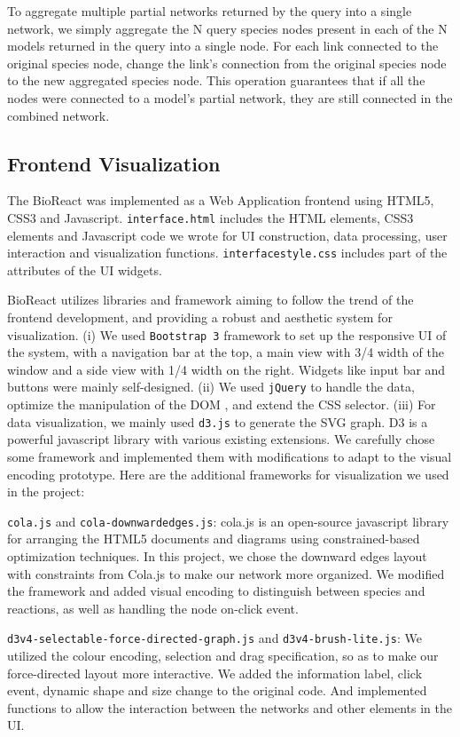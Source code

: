 \documentclass[journal]{vgtc}                %
\begin{document}
To aggregate multiple partial networks returned by the query into a single network, we simply aggregate the N query species nodes present in each of the N models returned in the query into a single node. For each link connected to the original species node, change the link’s connection from the original species node to the new aggregated species node. This operation guarantees that if all the nodes were connected to a model’s partial network, they are still connected in the combined network.

\subsection{Frontend Visualization}
The BioReact was implemented as a Web Application frontend using HTML5, CSS3 and Javascript. \texttt{interface.html} includes the HTML elements, CSS3 elements and Javascript code we wrote for UI construction, data processing, user interaction and visualization functions. \texttt{interface\textunderscore style.css} includes part of the attributes of the UI widgets.

BioReact utilizes libraries and framework aiming to follow the trend of the frontend development, and providing a robust and aesthetic system for visualization. (i) We used \texttt{Bootstrap 3} framework to set up the responsive UI of the system, with a navigation bar at the top, a main view with 3/4 width of the window and a side view with 1/4 width on the right. Widgets like input bar and buttons were mainly self-designed. (ii) We used \texttt{jQuery} to handle the data, optimize the manipulation of the DOM , and extend the CSS selector. (iii) For data visualization, we mainly used \texttt{d3.js} to generate the SVG graph. D3 is a powerful javascript library with various existing extensions. We carefully chose some framework and implemented them with modifications to adapt to the visual encoding prototype. Here are the additional frameworks for visualization we used in the project:

\texttt{cola.js} and \texttt{cola-downwardedges.js}: cola.js is an open-source javascript library for arranging the HTML5 documents and diagrams using constrained-based optimization techniques. In this project, we chose the downward edges layout with constraints from Cola.js to make our network more organized. We modified the framework and added visual encoding to distinguish between species and reactions, as well as handling the node on-click event.

\texttt{d3v4-selectable-force-directed-graph.js} and \texttt{d3v4-brush-lite.js}: We utilized the colour encoding, selection and drag specification, so as to make our force-directed layout more interactive. We added the information label, click event, dynamic shape and size change to the original code. And implemented functions to allow the interaction between the networks and other elements in the UI.
\end{document}
